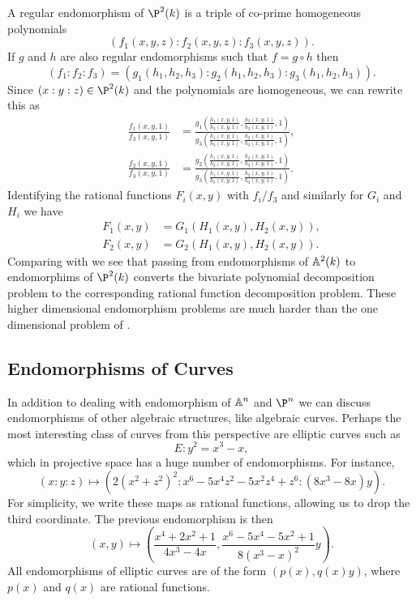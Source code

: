 A regular endomorphism of $\P^2(k)$ is a triple of co-prime homogeneous
polynomials
\[
(f_1(x,y,z): f_2(x,y,z): f_3(x,y,z)).
\]
If $g$ and $h$ are also regular endomorphisms such that $f = g \circ
h$ then 
\[
(f_1 : f_2 : f_3) =
 (g_1(h_1, h_2, h_3) : g_2(h_1,h_2,h_3) : g_3(h_1, h_2, h_3)).
\]
Since $(x:y:z) \in \P^2(k)$ and the polynomials are homogeneous, we can
rewrite this as
\[
\begin{aligned}
  \frac{f_1(x,y,1)}{f_3(x,y,1)} & 
   = \frac{g_1(\frac{h_1(x,y,1)}{h_3(x,y,1)},\frac{h_2(x,y,1)}{h_3(x,y,1)},1)}
          {g_3(\frac{h_1(x,y,1)}{h_3(x,y,1)},\frac{h_2(x,y,1)}{h_3(x,y,1)},1)},\\
  \frac{f_2(x,y,1)}{f_3(x,y,1)} & 
   = \frac{g_2(\frac{h_1(x,y,1)}{h_3(x,y,1)},\frac{h_2(x,y,1)}{h_3(x,y,1)},1)}
          {g_3(\frac{h_1(x,y,1)}{h_3(x,y,1)},\frac{h_2(x,y,1)}{h_3(x,y,1)},1)}.
\end{aligned}
\]
Identifying the rational functions $F_i(x,y)$ with $f_i/f_3$ and
similarly for $G_i$ and $H_i$ we have
\begin{equation}\label{2D:Projective:Decomp:Eq}
\begin{aligned}
F_1(x, y) & = G_1(H_1(x, y), H_2(x, y)), \\
F_2(x, y) & = G_2(H_1(x, y), H_2(x, y)).
\end{aligned}
\end{equation}
Comparing  with
 we see that passing from
endomorphisms of $\mathbb{A}^2(k)$ to endomorphims of $\P^2(k)$ converts the
bivariate polynomial decomposition problem to the corresponding
rational function decomposition problem.  These higher dimensional
endomorphism problems are much harder than the one dimensional problem
of .


\subsection{Endomorphisms of Curves}
\label{Endo:Curves:Sec}

In addition to dealing with endomorphism of $\mathbb{A}^n$ and $\P^n$ we can
discuss endomorphisms of other algebraic structures, like algebraic
curves.  Perhaps the most interesting class of curves from this
perspective are elliptic curves such as
\[
E: y^2 = x^3 - x,
\]
which in projective space has a huge number of endomorphisms.  For
instance, 
\[
(x:y:z) \mapsto (2(x^2+z^2)^2 : x^6-5x^4 z^2 - 5 x^2 z^4 + z^6 :
  (8x^3 - 8 x)y).
\]
For simplicity, we write these maps as rational functions, allowing us to
drop the third coordinate.  The previous endomorphism is then
\begin{equation} \label{Double:Endo:Eq}
(x, y) \mapsto \left( \frac{x^4+2x^2+1}{4x^3-4x}, 
  \frac{x^6-5x^4-5x^2+1}{8(x^3-x)^2}y\right).
\end{equation}
All endomorphisms of elliptic curves are of the form $(p(x), q(x)
y)$, where $p(x)$ and $q(x)$ are rational functions.  

